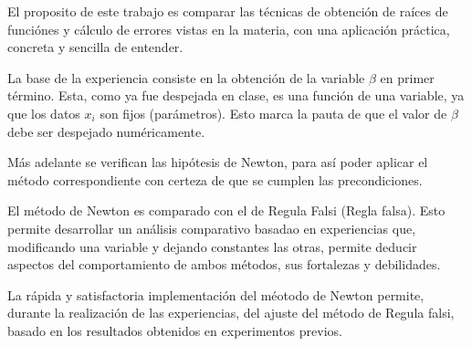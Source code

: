 El proposito de este trabajo es comparar las t\'ecnicas de obtenci\'on de ra\'ices 
de funci\'ones y c\'alculo de errores vistas en la materia, 
con una aplicaci\'on pr\'actica, concreta y sencilla de entender.

La base de la experiencia consiste en la obtenci\'on de la variable $\beta$ en
primer t\'ermino. Esta, como ya fue despejada en clase, es una funci\'on
de una variable, ya que los datos $x_i$ son fijos (par\'ametros). 
Esto marca la pauta de que el valor de $\beta$ debe ser despejado
num\'ericamente. 

M\'as adelante se verifican las hip\'otesis de Newton, para as\'i poder aplicar
el m\'etodo correspondiente con certeza de que se cumplen las precondiciones.

El m\'etodo de Newton es comparado con el de Regula Falsi (Regla falsa). Esto
permite desarrollar un an\'alisis comparativo basadao en experiencias que,
modificando una variable y dejando constantes las otras, permite deducir
aspectos del comportamiento de ambos m\'etodos, sus fortalezas y debilidades.


La r\'apida y satisfactoria implementaci\'on del m\'eotodo de Newton permite,
durante la realizaci\'on de las experiencias, del ajuste del m\'etodo de Regula
falsi, basado en los resultados obtenidos en experimentos previos.

